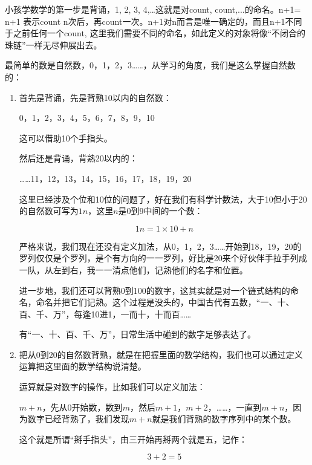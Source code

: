 小孩学数学的第一步是背诵，1, 2, 3, 4,…这就是对count, count,...的命名。n+1= n+1 表示count n次后，再count一次。n+1对n而言是唯一确定的，而且n+1不同于之前任何一个count, 这里我们需要不同的命名，如此定义的对象将像“不闭合的珠链”一样无尽伸展出去。

最简单的数是自然数，0，1，2，3……，从学习的角度，我们是这么掌握自然数的：

\begin{enumerate}
\item 

首先是背诵，先是背熟10以内的自然数：

\begin{center}
0，1，2，3，4，5，6，7，8，9，10
\end{center}

这可以借助10个手指头。

然后还是背诵，背熟20以内的：

\begin{center}
……11，12，13，14，15，16，17，18，19，20
\end{center}

这里已经涉及个位和10位的问题了，好在我们有科学计数法，大于10但小于20的自然数可写为$1n$，这里$n$是0到9中间的一个数：

\begin{equation*}
1n  = 1 \times 10 + n
\end{equation*}

严格来说，我们现在还没有定义加法，从0，1，2，3……开始到18，19，20的罗列仅仅是个罗列，是个有方向的一一罗列，好比是20来个好伙伴手拉手列成一队，从左到右，我一一清点他们，记熟他们的名字和位置。

进一步地，我们还可以背熟0到100的数字，这其实就是对一个链式结构的命名，命名并把它们记熟。这个过程是没头的，中国古代有五数，“一、十、百、千、万”，每逢10进1，一而十，十而百……

有“一、十、百、千、万”，日常生活中碰到的数字足够表达了。

\item

把从0到20的自然数背熟，就是在把握里面的数学结构，我们也可以通过定义运算把这里面的数学结构说清楚。

运算就是对数字的操作，比如我们可以定义加法：

$m + n$，先从0开始数，数到$m$，然后$m+1$，$m+2$，……，一直到$m+n$，因为数字已经背熟了，我们发现$m+n$就是我们背熟的数字序列中的某个数。

这个就是所谓“掰手指头”，由三开始再掰两个就是五，记作：

\begin{equation*}
3+2 = 5
\end{equation*}


\end{enumerate}
